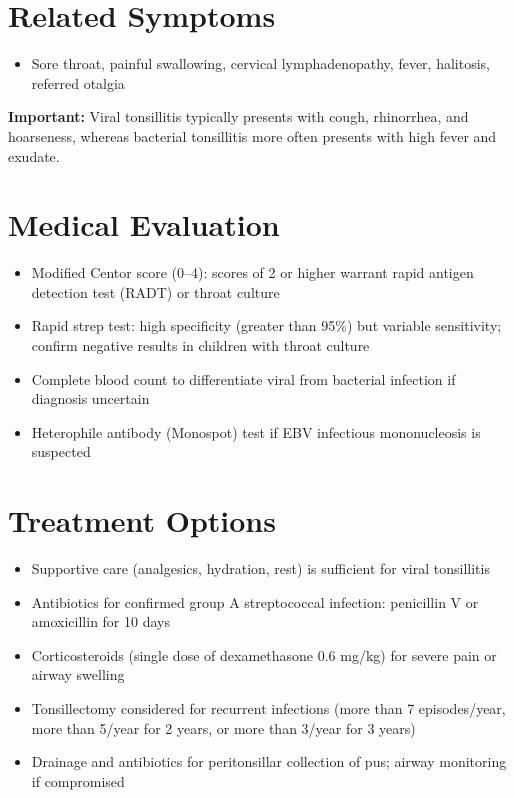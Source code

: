 \section*{Related Symptoms}
\begin{itemize}
  \item Sore throat, painful swallowing, cervical lymphadenopathy, fever, halitosis, referred otalgia
\end{itemize}
\textbf{Important:} Viral tonsillitis typically presents with cough, rhinorrhea, and hoarseness, whereas bacterial tonsillitis more often presents with high fever and exudate.

\section*{Medical Evaluation}
\begin{itemize}
  \item Modified Centor score (0--4): scores of 2 or higher warrant rapid antigen detection test (RADT) or throat culture
  \item Rapid strep test: high specificity (greater than 95\%) but variable sensitivity; confirm negative results in children with throat culture
  \item Complete blood count to differentiate viral from bacterial infection if diagnosis uncertain
  \item Heterophile antibody (Monospot) test if EBV infectious mononucleosis is suspected
\end{itemize}

\section*{Treatment Options}
\begin{itemize}
  \item Supportive care (analgesics, hydration, rest) is sufficient for viral tonsillitis
  \item Antibiotics for confirmed group A streptococcal infection: penicillin V or amoxicillin for 10 days
  \item Corticosteroids (single dose of dexamethasone 0.6 mg/kg) for severe pain or airway swelling
  \item Tonsillectomy considered for recurrent infections (more than 7 episodes/year, more than 5/year for 2 years, or more than 3/year for 3 years)
  \item Drainage and antibiotics for peritonsillar collection of pus; airway monitoring if compromised
\end{itemize}


